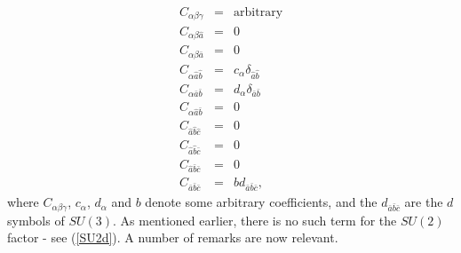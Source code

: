 \documentclass[a4paper,11pt]{article}
\newcommand{\nn}{\nonumber}
\begin{document}
\begin{eqnarray}
C_{\alpha\beta\gamma}&=&\textrm{arbitrary} \nn \\ 
 C_{\alpha\beta\hat{a}}&=&0 \nn \\ \nn
C_{\alpha\beta\bar{a}}&=&0\\ \nn
 C_{\alpha \hat{a}\hat{b}}&=&c_{\alpha}\delta_{\hat{a}\hat{b}}\\ \nn
  C_{\alpha \bar{a}\bar{b}}&=&d_{\alpha}\delta_{\bar{a}\bar{b}}\\ \nn 
  C_{\alpha \hat{a}\bar{b}}&=&0  \nn \\
C_{ \hat{a} \hat{b} \hat{c}}&=&0\label{SU2d}\\ 
 C_{ \hat{a} \hat{b} \bar{c}}&=&0 \nn \\ 
\nn C_{ \hat{a} \bar{b} \bar{c}}&=&0\\ \nn
 C_{ \bar{a} \bar{b} \bar{c}}&=&b d_{\bar{a} \bar{b} \bar{c}}, \nn
\end{eqnarray}
where $C_{\alpha\beta\gamma}$, 
$c_{\alpha}$, $d_{\alpha}$ and  $b$ denote some arbitrary coefficients,
and the $d_{\bar{a} \bar{b} \bar{c}}$ are the $d$ symbols of $SU(3)$.
As mentioned earlier, there is no such term for the $SU(2)$ factor - see
(\ref{SU2d}). A number of remarks are now relevant.
\end{document}
